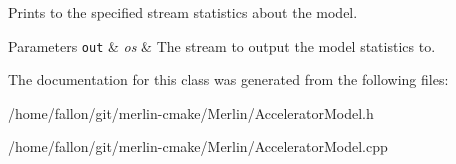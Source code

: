Prints to the specified stream statistics about the model. 
\begin{DoxyParams}[1]{Parameters}
\mbox{\tt out}  & {\em os} & The stream to output the model statistics to. \\
\hline
\end{DoxyParams}


The documentation for this class was generated from the following files\+:\begin{DoxyCompactItemize}
\item 
/home/fallon/git/merlin-\/cmake/\+Merlin/Accelerator\+Model.\+h\item 
/home/fallon/git/merlin-\/cmake/\+Merlin/Accelerator\+Model.\+cpp\end{DoxyCompactItemize}
